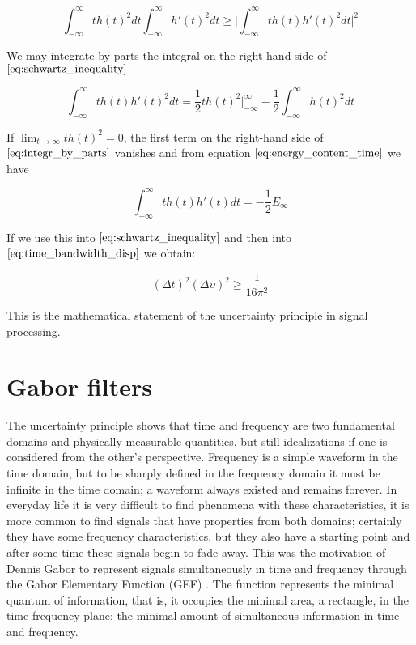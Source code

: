 \begin{equation}\label{eq:schwartz_inequality}
    \int_{-\infty}^{\infty}t h(t)^2 dt \int_{-\infty}^{\infty}h'(t)^2 dt  \geq \biggr\rvert \int_{-\infty}^{\infty}t h(t)h'(t)^2 dt \biggr\rvert^{2}
\end{equation}

We may integrate by parts the integral on the right-hand side of $\eqref{eq:schwartz_inequality}$

\begin{equation}\label{eq:integr_by_parts}
    \int_{-\infty}^{\infty}t h(t) h'(t)^2 dt =  \frac{1}{2}t h(t)^2 \biggr\rvert_{-\infty}^{\infty} - \frac{1}{2} \int_{-\infty}^{\infty}h(t)^2 dt
\end{equation}

If $\lim_{t\rightarrow \infty} t h(t)^2=0$, the first term on the right-hand side of $\eqref{eq:integr_by_parts}$ vanishes and from equation $\eqref{eq:energy_content_time}$ we have

\begin{equation}\label{eq:energy_content_developped}
    \int_{-\infty}^{\infty} t h(t)h'(t) dt = -\frac{1}{2} E_{\infty}
\end{equation}

If we use this into $\eqref{eq:schwartz_inequality}$ and then into $\eqref{eq:time_bandwidth_disp}$ we obtain:

\begin{equation}\label{eq:uncertainty_principle_freq_square}
   (\Delta t)^2(\Delta \upsilon)^2 \geq \frac{1}{16\pi^{2}} 
\end{equation}

This is the mathematical statement of the uncertainty principle in signal processing.

\section{Gabor filters}

The uncertainty principle shows that time and frequency are two fundamental domains and physically measurable quantities, but still idealizations if one is considered from the other's perspective.
Frequency is a simple waveform in the time domain, but to be sharply defined in the frequency domain it must be infinite in the time domain; a waveform always existed and remains forever. In everyday life it is very difficult to find phenomena with these characteristics, it is more common to find signals that have properties from both domains; certainly they have some frequency characteristics, but they also have a starting point and after some time these signals begin to fade away. This was the motivation of Dennis Gabor to represent signals simultaneously in time and frequency through the Gabor Elementary Function (GEF) \cite{Gabor:JIEE:1946a}. The function represents the minimal quantum of information, that is, it occupies the minimal area, a rectangle, in the time-frequency plane; the minimal amount of simultaneous information in time and frequency.  


